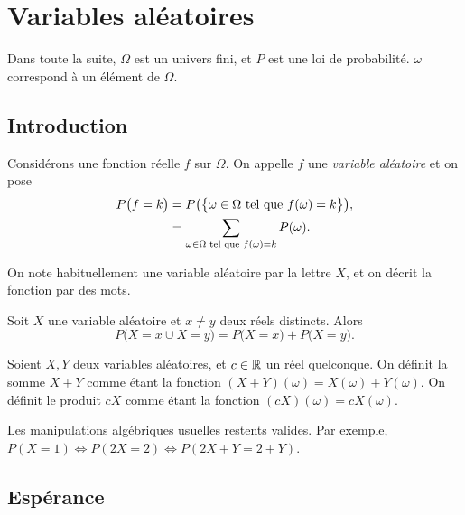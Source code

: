 \documentclass[a4paper, 12pt]{report}
\begin{document}
\chapter{Variables aléatoires}

Dans toute la suite, $\Omega$ est un univers fini, et $P$ est une loi de probabilité. $\omega$ correspond à un élément de $\Omega$.

\section{Introduction}

\begin{defn}
	Considérons une fonction réelle $f$ sur $\Omega$.
	On appelle $f$ une \emph{variable aléatoire} et on pose
		\begin{align*}
			P\bigl( f = k \bigr) & = P\bigl( \bigl\{  \omega \in \Omega \text{ tel que } f(\omega)=k \bigr\}\bigr), \\
								& = \sum_{\omega \in \Omega \text{ tel que } f(\omega)=k} P(\omega).
		\end{align*}
\end{defn}

\begin{nota}
	On note habituellement une variable aléatoire par la lettre $X$, et on décrit la fonction par des mots.
\end{nota}

\begin{thm}
	Soit $X$ une variable aléatoire et $x \neq y$ deux réels distincts.
	Alors 
		\[ P\bigl( X = x \cup X = y \bigr) = P\bigl( X = x) + P\bigl(X = y \bigr). \]
\end{thm}

\begin{defn}
	Soient $X, Y$ deux variables aléatoires, et $c\in\mathbb{R}$ un réel quelconque.
	On définit la somme $X+Y$ comme étant la fonction $(X+Y)(\omega) = X(\omega) + Y(\omega)$.
	On définit le produit $cX$ comme étant la fonction $(cX)(\omega) = c X(\omega)$.
\end{defn}

\begin{rmq}
	Les manipulations algébriques usuelles restents valides.
	Par exemple, $P(X = 1) \iff P(2X = 2) \iff P(2X + Y = 2 + Y)$.
\end{rmq}

\section{Espérance}
\end{document}

